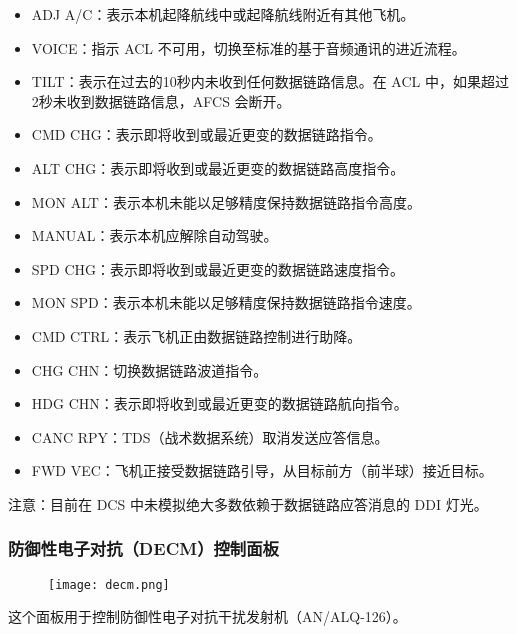 \begin{itemize}
  \item ADJ A/C：表示本机起降航线中或起降航线附近有其他飞机。
  \item VOICE：指示 ACL 不可用，切换至标准的基于音频通讯的进近流程。
  \item TILT：表示在过去的10秒内未收到任何数据链路信息。在 ACL 中，如果超过2秒未收到数据链路信息，AFCS 会断开。
  \item CMD CHG：表示即将收到或最近更变的数据链路指令。
  \item ALT CHG：表示即将收到或最近更变的数据链路高度指令。
  \item MON ALT：表示本机未能以足够精度保持数据链路指令高度。
  \item MANUAL：表示本机应解除自动驾驶。
  \item SPD CHG：表示即将收到或最近更变的数据链路速度指令。
  \item MON SPD：表示本机未能以足够精度保持数据链路指令速度。
  \item CMD CTRL：表示飞机正由数据链路控制进行助降。
  \item CHG CHN：切换数据链路波道指令。
  \item HDG CHN：表示即将收到或最近更变的数据链路航向指令。
  \item CANC RPY：TDS（战术数据系统）取消发送应答信息。
  \item FWD VEC：飞机正接受数据链路引导，从目标前方（前半球）接近目标。
\end{itemize}
注意：目前在 DCS 中未模拟绝大多数依赖于数据链路应答消息的 DDI 灯光。

\subsubsection{防御性电子对抗（DECM）控制面板}
\begin{figure}[htb]
  \center
  \texttt{[image: decm.png]}
\end{figure}
这个面板用于控制防御性电子对抗干扰发射机（AN/ALQ-126）。

